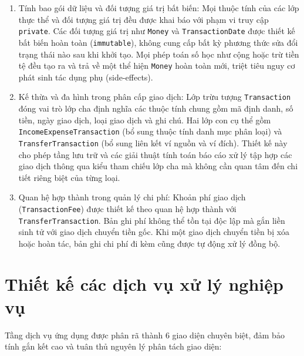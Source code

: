 \documentclass[a4paper,12pt]{report}
\newcommand{\passthrough}[1]{#1}
\begin{document}
\begin{enumerate}
\def\labelenumi{\arabic{enumi}.}
\item
  Tính bao gói dữ liệu và đối tượng giá trị bất biến: Mọi thuộc tính của
  các lớp thực thể và đối tượng giá trị đều được khai báo với phạm vi
  truy cập \passthrough{\lstinline!private!}. Các đối tượng giá trị như
  \passthrough{\lstinline!Money!} và
  \passthrough{\lstinline!TransactionDate!} được thiết kế bất biến hoàn
  toàn (\passthrough{\lstinline!immutable!}), không cung cấp bất kỳ
  phương thức sửa đổi trạng thái nào sau khi khởi tạo. Mọi phép toán số
  học như cộng hoặc trừ tiền tệ đều tạo ra và trả về một thể hiện
  \passthrough{\lstinline!Money!} hoàn toàn mới, triệt tiêu nguy cơ phát
  sinh tác dụng phụ (side-effects).
\item
  Kế thừa và đa hình trong phân cấp giao dịch: Lớp trừu tượng
  \passthrough{\lstinline!Transaction!} đóng vai trò lớp cha định nghĩa
  các thuộc tính chung gồm mã định danh, số tiền, ngày giao dịch, loại
  giao dịch và ghi chú. Hai lớp con cụ thể gồm
  \passthrough{\lstinline!IncomeExpenseTransaction!} (bổ sung thuộc tính
  danh mục phân loại) và \passthrough{\lstinline!TransferTransaction!}
  (bổ sung liên kết ví nguồn và ví đích). Thiết kế này cho phép tầng lưu
  trữ và các giải thuật tính toán báo cáo xử lý tập hợp các giao dịch
  thông qua kiểu tham chiếu lớp cha mà không cần quan tâm đến chi tiết
  riêng biệt của từng loại.
\item
  Quan hệ hợp thành trong quản lý chi phí: Khoản phí giao dịch
  (\passthrough{\lstinline!TransactionFee!}) được thiết kế theo quan hệ
  hợp thành với \passthrough{\lstinline!TransferTransaction!}. Bản ghi
  phí không thể tồn tại độc lập mà gắn liền sinh tử với giao dịch chuyển
  tiền gốc. Khi một giao dịch chuyển tiền bị xóa hoặc hoàn tác, bản ghi
  chi phí đi kèm cũng được tự động xử lý đồng bộ.
\end{enumerate}

\section{Thiết kế các dịch vụ xử lý nghiệp
vụ}\label{thiux1ebft-kux1ebf-cuxe1c-dux1ecbch-vux1ee5-xux1eed-luxfd-nghiux1ec7p-vux1ee5}

Tầng dịch vụ ứng dụng được phân rã thành 6 giao diện chuyên biệt, đảm
bảo tính gắn kết cao và tuân thủ nguyên lý phân tách giao diện:
\end{document}
